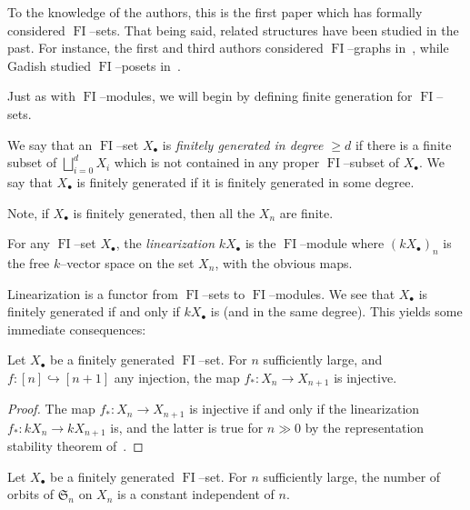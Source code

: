 \documentclass[ALCO,ThmDefs,Unicode,epreuves]{cedram}
\DeclareMathOperator{\FI}{FI}
\newcommand{\Sn}{\mathfrak{S}}
\newcommand{\dt}{\bullet}
\begin{document}
To the knowledge of the authors, this is the first paper which has formally considered $\FI$--sets. That being said, related structures have been studied in the past. For instance, the first and third authors considered $\FI$--graphs in~\cite{RW}, while Gadish studied $\FI$--posets in~\cite{G}.

Just as with $\FI$--modules, we will begin by defining finite generation for $\FI$--sets.

\begin{definition}\label{fgset}
We say that an $\FI$--set $X_{\dt}$ is \emph{finitely generated in degree $\geq d$} if there is a finite subset of $\bigsqcup_{i=0}^d X_i$ which is not contained in any proper $\FI$--subset of $X_{\dt}$. 
We say that $X_{\dt}$ is finitely generated if it is finitely generated in some degree.
\end{definition}
 Note, if $X_{\dt}$ is finitely generated, then all the $X_n$ are finite. 


\begin{definition}
For any $\FI$--set $X_{\dt}$, the \emph{linearization} $k X_{\dt}$ is the $\FI$--module where $(kX_{\dt})_n$ is the free $k$--vector space on the set $X_n$, with the obvious maps. 
\end{definition}

Linearization is a functor from $\FI$--sets to $\FI$--modules.
We see that $X_\dt$ is finitely generated if and only if $k X_\dt$ is (and in the same degree). This yields some immediate consequences:


\begin{prop} \label{elementstab}
Let $X_\dt$ be a finitely generated $\FI$--set. For $n$ sufficiently large, and $f:[n] \hookrightarrow [n+1]$ any injection, the map $f_{\ast}: X_n \to X_{n+1}$ is injective.
\end{prop}


\begin{proof}
The map $f_{\ast}: X_n \to X_{n+1}$ is injective if and only if the linearization $f_{\ast}: kX_n \to kX_{n+1}$ is, and the latter is true for $n \gg 0$ by the representation stability theorem of~\cite[Theorem~1.13]{CEF}.
\end{proof}

\begin{prop} \label{numberorbitsstab}
Let $X_\dt$ be a finitely generated $\FI$--set. For $n$ sufficiently large, the number of orbits of $\Sn_n$ on $X_n$ is a constant independent of $n$. 
\end{prop}
\end{document}
